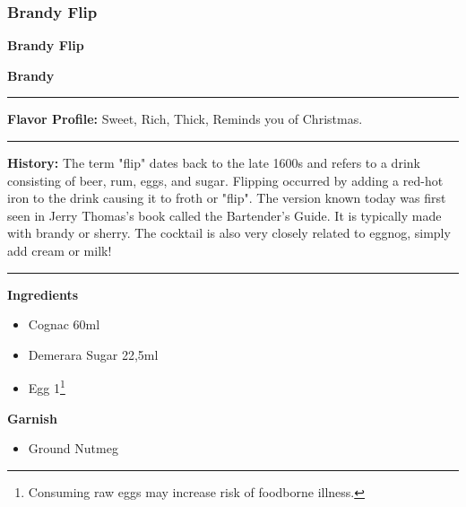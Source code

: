 \subsubsection{Brandy Flip}
\noindent
\begin{minipage}{.49\textwidth}
    \noindent\textbf{\LARGE Brandy Flip}
\end{minipage}
\hspace{.02\textwidth}
\begin{minipage}{.49\textwidth}
    \raggedleft
    \textbf{\large Brandy}\\
\end{minipage}
\vspace{.5em}\hrule\vspace{.5em}
\noindent
\textbf{\large Flavor Profile:} Sweet, Rich, Thick, Reminds you of Christmas.
\vspace{.5em}\hrule\vspace{.5em}
\noindent
\textbf{\large History:} The term "flip" dates back to the late 1600s and refers to a drink consisting of beer, rum, eggs, and sugar. Flipping occurred by adding a red-hot iron to the drink causing it to froth or "flip". The version known today was first seen in Jerry Thomas's book called the Bartender's Guide. It is typically made with brandy or sherry. The cocktail is also very closely related to eggnog, simply add cream or milk!
\vspace{.5em}\hrule\vspace{.5em}
\noindent
\begin{minipage}[t]{.49\textwidth}
    \noindent
    \textbf{\large Ingredients}
    \begin{itemize}
        \item Cognac 60ml
        \item Demerara Sugar 22,5ml
        \item Egg 1\footnote{Consuming raw eggs may increase risk of foodborne illness.}
    \end{itemize}
    \noindent
    \textbf{\large Garnish}
    \begin{itemize}
        \item Ground Nutmeg
    \end{itemize}
\end{minipage}
